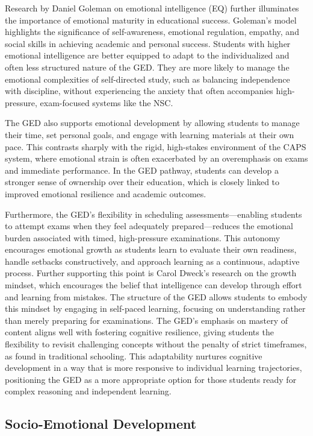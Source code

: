 \documentclass[12pt]{article}
\begin{document}
Research by Daniel Goleman on emotional intelligence (EQ) further illuminates the importance of emotional maturity in educational success. Goleman’s model highlights the significance of self-awareness, emotional regulation, empathy, and social skills in achieving academic and personal success. Students with higher emotional intelligence are better equipped to adapt to the individualized and often less structured nature of the GED. They are more likely to manage the emotional complexities of self-directed study, such as balancing independence with discipline, without experiencing the anxiety that often accompanies high-pressure, exam-focused systems like the NSC.

The GED also supports emotional development by allowing students to manage their time, set personal goals, and engage with learning materials at their own pace. This contrasts sharply with the rigid, high-stakes environment of the CAPS system, where emotional strain is often exacerbated by an overemphasis on exams and immediate performance. In the GED pathway, students can develop a stronger sense of ownership over their education, which is closely linked to improved emotional resilience and academic outcomes.

Furthermore, the GED’s flexibility in scheduling assessments—enabling students to attempt exams when they feel adequately prepared—reduces the emotional burden associated with timed, high-pressure examinations. This autonomy encourages emotional growth as students learn to evaluate their own readiness, handle setbacks constructively, and approach learning as a continuous, adaptive process.
Further supporting this point is Carol Dweck’s research on the growth mindset, which encourages the belief that intelligence can develop through effort and learning from mistakes. The structure of the GED allows students to embody this mindset by engaging in self-paced learning, focusing on understanding rather than merely preparing for examinations. The GED’s emphasis on mastery of content aligns well with fostering cognitive resilience, giving students the flexibility to revisit challenging concepts without the penalty of strict timeframes, as found in traditional schooling. This adaptability nurtures cognitive development in a way that is more responsive to individual learning trajectories, positioning the GED as a more appropriate option for those students ready for complex reasoning and independent learning.

\subsection{Socio-Emotional Development}
\end{document}
